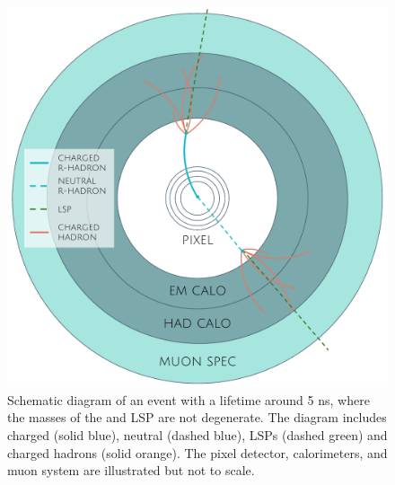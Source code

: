\begin{figure}[tb]
\centering
\includegraphics[width=\fullfig]{figures/rhadron_metastable_short.pdf}
\caption{Schematic diagram of an \rhadron event with a lifetime around 5 ns, where the masses of the \rhadron and \acs*{LSP} are not degenerate. The diagram includes charged \rhadrons (solid blue), neutral \rhadrons (dashed blue), \acsp*{LSP} (dashed green) and charged hadrons (solid orange). The pixel detector, calorimeters, and muon system are illustrated but not to scale.}
\label{fig:rhadron_metastable_short}
\end{figure}

